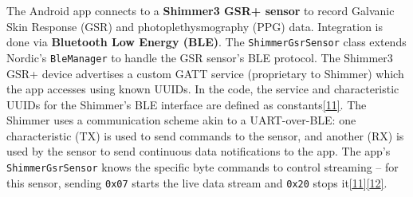 \documentclass[12pt,a4paper]{article}
\begin{document}
The Android app connects to a \textbf{Shimmer3 GSR+ sensor} to record Galvanic Skin Response (GSR) and photoplethysmography (PPG) data. Integration is done via \textbf{Bluetooth Low Energy (BLE)}. The \passthrough{\lstinline!ShimmerGsrSensor!} class extends Nordic's \passthrough{\lstinline!BleManager!} to handle the GSR sensor's BLE protocol. The Shimmer3 GSR+ device advertises a custom GATT service (proprietary to Shimmer) which the app accesses using known UUIDs. In the code, the service and characteristic UUIDs for the Shimmer's BLE interface are defined as constants\href{https://github.com/buccancs/GSR-Dual-Video-System/blob/05ae360cb7b4ae7c7861f72deb235ad64a74b38e/android/app/src/main/java/com/yourcompany/gsrcapture/hardware/ShimmerGsrSensor.kt\#L16-L24}{{[}11{]}}. The Shimmer uses a communication scheme akin to a UART-over-BLE: one characteristic (TX) is used to send commands to the sensor, and another (RX) is used by the sensor to send continuous data notifications to the app. The app's \passthrough{\lstinline!ShimmerGsrSensor!} knows the specific byte commands to control streaming -- for this sensor, sending \passthrough{\lstinline!0x07!} starts the live data stream and \passthrough{\lstinline!0x20!} stops it\href{https://github.com/buccancs/GSR-Dual-Video-System/blob/05ae360cb7b4ae7c7861f72deb235ad64a74b38e/android/app/src/main/java/com/yourcompany/gsrcapture/hardware/ShimmerGsrSensor.kt\#L16-L24}{{[}11{]}}\href{https://github.com/buccancs/GSR-Dual-Video-System/blob/05ae360cb7b4ae7c7861f72deb235ad64a74b38e/android/app/src/main/java/com/yourcompany/gsrcapture/hardware/ShimmerGsrSensor.kt\#L52-L60}{{[}12{]}}.
\end{document}
